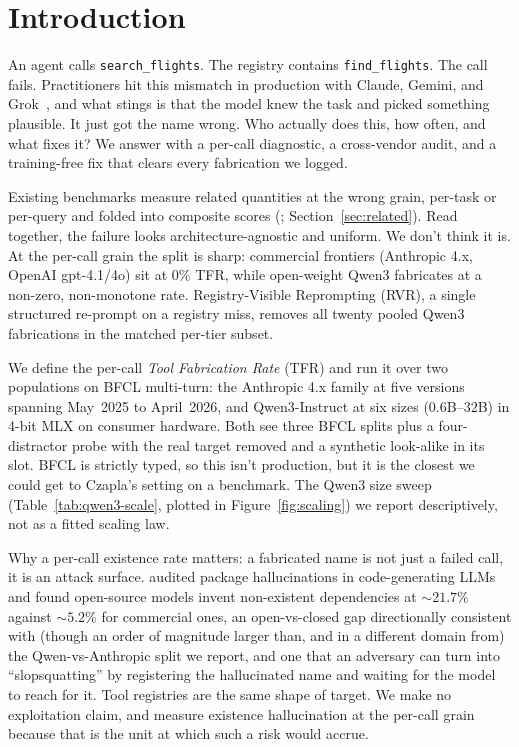\section{Introduction}
\label{sec:intro}

An agent calls \texttt{search\_flights}. The registry contains
\texttt{find\_flights}. The call fails. Practitioners hit this mismatch
in production with Claude, Gemini, and Grok~\citep{czapla2026}, and what
stings is that the model knew the task and picked something plausible. It
just got the name wrong. Who actually does this, how often, and what
fixes it? We answer with a per-call diagnostic, a cross-vendor audit,
and a training-free fix that clears every fabrication we logged.

Existing benchmarks measure related quantities at the wrong grain,
per-task or per-query and folded into composite scores
(\citealp{li2023apibank,huang2024metatool,cao2025reliability};
Section~\ref{sec:related}). Read together, the failure looks
architecture-agnostic and uniform. We don't think it is. At the per-call
grain the split is sharp: commercial frontiers (Anthropic 4.x, OpenAI
gpt-4.1/4o) sit at $0\%$ TFR, while open-weight Qwen3 fabricates at a
non-zero, non-monotone rate. Registry-Visible Reprompting (RVR), a
single structured re-prompt on a registry miss, removes all twenty
pooled Qwen3 fabrications in the matched per-tier subset.

We define the per-call \emph{Tool Fabrication Rate} (TFR) and run it
over two populations on BFCL multi-turn: the Anthropic 4.x family at
five versions spanning May~2025 to April~2026, and Qwen3-Instruct at
six sizes ($0.6$B--$32$B) in 4-bit MLX on consumer hardware. Both see
three BFCL splits plus a four-distractor probe with the real target
removed and a synthetic look-alike in its slot. BFCL is strictly typed,
so this isn't production, but it is the closest we could get to Czapla's
setting on a benchmark. The Qwen3 size sweep (Table~\ref{tab:qwen3-scale}, plotted in Figure~\ref{fig:scaling}) we report descriptively, not as a fitted scaling law.

Why a per-call existence rate matters: a fabricated name is not just a
failed call, it is an attack surface. \citet{spracklen2025packages}
audited package hallucinations in code-generating LLMs and found
open-source models invent non-existent dependencies at $\sim\!21.7\%$
against $\sim\!5.2\%$ for commercial ones, an open-vs-closed gap directionally consistent with (though an order of
magnitude larger than, and in a different domain from) the
Qwen-vs-Anthropic split we report, and one that an adversary can
turn into ``slopsquatting'' by registering the hallucinated name and
waiting for the model to reach for it. Tool registries are the same
shape of target. We make no exploitation claim, and measure existence
hallucination at the per-call grain because that is the unit at which
such a risk would accrue.

